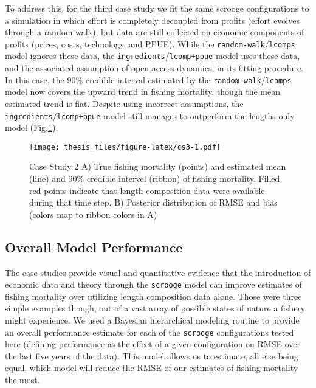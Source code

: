 \documentclass[twoside,12pt,final]{ucthesis-CA2012}
\begin{document}
\begin{ucmainmatter}
To address this, for the third case study we fit the same scrooge
configurations to a simulation in which effort is completely decoupled
from profits (effort evolves through a random walk), but data are still
collected on economic components of profits (prices, costs, technology,
and PPUE). While the \texttt{random-walk}/\texttt{lcomps} model ignores
these data, the \texttt{ingredients}/\texttt{lcomp+ppue} model uses
these data, and the associated assumption of open-access dynamics, in
its fitting procedure. In this case, the 90\% credible interval
estimated by the \texttt{random-walk}/\texttt{lcomps} model now covers
the upward trend in fishing mortality, though the mean estimated trend
is flat. Despite using incorrect assumptions, the
\texttt{ingredients}/\texttt{lcomp+ppue} model still manages to
outperform the lengths only model (Fig.\ref{fig:cs3}).
\begin{figure}
\centering
\texttt{[image: thesis\_files/figure-latex/cs3-1.pdf]}
\caption{\label{fig:cs3}Case Study 2 A) True fishing mortality (points) and
estimated mean (line) and 90\% credible intervel (ribbon) of fishing
mortality. Filled red points indicate that length composition data were
available during that time step. B) Posterior distribution of RMSE and
bias (colors map to ribbon colors in A)}
\end{figure}
\subsection{Overall Model Performance}\label{overall-model-performance}

The case studies provide visual and quantitative evidence that the
introduction of economic data and theory through the \texttt{scrooge}
model can improve estimates of fishing mortality over utilizing length
composition data alone. Those were three simple examples though, out of
a vast array of possible states of nature a fishery might experience. We
used a Bayesian hierarchical modeling routine to provide an overall
performance estimate for each of the \texttt{scrooge} configurations
tested here (defining performance as the effect of a given configuration
on RMSE over the last five years of the data). This model allows us to
estimate, all else being equal, which model will reduce the RMSE of our
estimates of fishing mortality the most.


\end{ucmainmatter}
\end{document}

